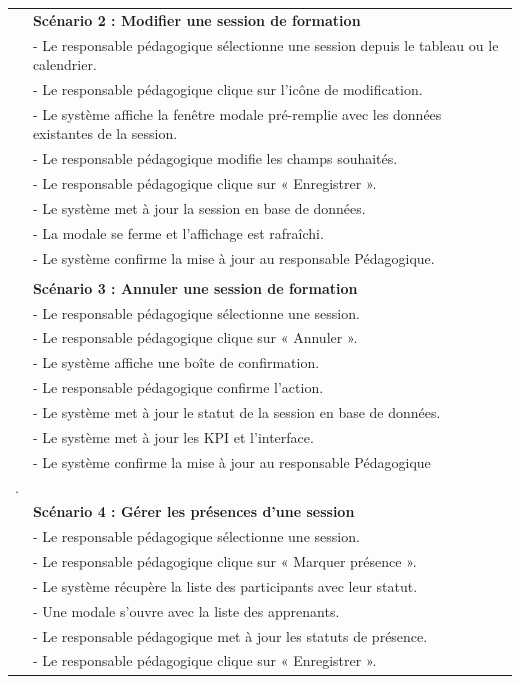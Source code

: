 {\begin{longtable}{|l|p{12cm}|}
\\
& \textbf{Scénario 2 : Modifier une session de formation} \\
&- Le responsable pédagogique sélectionne une session depuis le tableau ou le calendrier. \\
&- Le responsable pédagogique clique sur l'icône de modification. \\
&- Le système affiche la fenêtre modale pré-remplie avec les données existantes de la session. \\
&- Le responsable pédagogique modifie les champs souhaités. \\
&- Le responsable pédagogique clique sur « Enregistrer ». \\
&- Le système met à jour la session en base de données. \\
&- La modale se ferme et l'affichage est rafraîchi. \\
&- Le système confirme la mise à jour au responsable Pédagogique.\\
\\
& \textbf{Scénario 3 : Annuler une session de formation} \\
&- Le responsable pédagogique sélectionne une session. \\
&- Le responsable pédagogique clique sur « Annuler ». \\
&- Le système affiche une boîte de confirmation. \\
&- Le responsable pédagogique confirme l'action. \\
&- Le système met à jour le statut de la session en base de données. \\
&- Le système met à jour les KPI et l'interface. \\
&- Le système confirme la mise à jour au responsable Pédagogique\\.
\\
& \textbf{Scénario 4 : Gérer les présences d'une session} \\
&- Le responsable pédagogique sélectionne une session. \\
&- Le responsable pédagogique clique sur « Marquer présence ». \\
&- Le système récupère la liste des participants avec leur statut. \\
&- Une modale s'ouvre avec la liste des apprenants. \\
&- Le responsable pédagogique met à jour les statuts de présence. \\
&- Le responsable pédagogique clique sur « Enregistrer ». \\

\end{longtable}}

